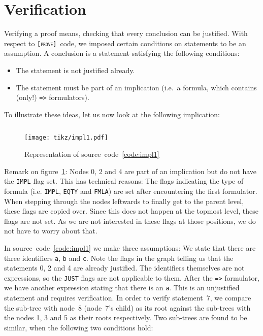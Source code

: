 \documentclass[british]{article}
\newenvironment{code}{\captionsetup{type=listing}}{}
\newcommand\prv{bc}
\newcommand\m[1]{\texttt{#1}}
\newcommand\name{\texttt{\textsc{[prove]}}}
\begin{document}
\pagebreak{}

\section{Verification}\label{sec:verif}

Verifying a proof means, checking that every conclusion can be justified.  With
respect to \name\ code, we imposed certain conditions on statements to be an
assumption. A conclusion is a statement satisfying the following conditions:

\begin{itemize}
	\item
		The statement is not justified already.
	\item
		The statement must be part of an implication (i.e.\ a formula, which
		contains (only!) \m{=>} formulators). 
\end{itemize}

To illustrate these ideas, let us now look at the following implication:

\begin{code}
\label{code:impl1}
\inputminted[linenos]{\prv}{examples/impl1.prove}
\end{code}

\begin{figure}[!h]
\caption{Representation of source~code~\ref{code:impl1}}\label{fig:impl1}
\centering
\texttt{[image: tikz/impl1.pdf]}
\end{figure}

Remark on figure~\ref{fig:impl1}: Nodes 0, 2 and 4 are part of an implication
but do not have the \texttt{IMPL} flag set. This has technical reasons: The
flags indicating the type of formula (i.e. \texttt{IMPL}, \texttt{EQTY} and
\texttt{FMLA}) are set after encountering the first formulator. When stepping
through the nodes leftwards to finally get to the parent level, these flags are
copied over. Since this does not happen at the topmost level, these flags are
not set. As we are not interested in these flags at those positions, we do not
have to worry about that.

\pagebreak{}

In source~code~\ref{code:impl1} we make three assumptions: We state that there
are three identifiers \m{a}, \m{b} and \m{c}. Note the flags in the graph
telling us that the statements 0, 2 and 4 are already justified. The identifiers
themselves are not expressions, so the \texttt{JUST} flags are not applicable to
them. After
the \m{=>} formulator, we have another expression stating that there is an \m{a}.
This is an unjustified statement and requires verification. In order to verify
statement~7, we compare the sub-tree with node~8 (node~7's child) as its root
against the sub-trees with the nodes 1, 3 and 5 as their roots respectively. Two
sub-trees are found to be similar, when the following two conditions hold:
\end{document}
